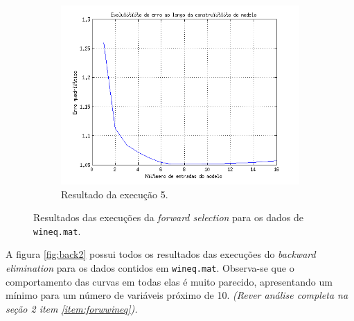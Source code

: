 \begin{figure}[H]
			\begin{subfigure}{.5\textwidth}
				  \centering
				  \includegraphics[width=1\linewidth]{image/forward5_2}
				  \caption{Resultado da execução 5.}
				  \label{forward5_2}
				\end{subfigure}	
			
			\caption{Resultados das execuções da \textit{forward selection} para os
			dados de \texttt{wineq.mat}.}
			\label{fig:forw2}
			\end{figure}
			
		\FloatBarrier

\newpage

A figura \ref{fig:back2} possui todos os resultados das
execuções do \textit{backward elimination} para os dados contidos em
\texttt{wineq.mat}. Observa-se que o comportamento das curvas em todas elas é
muito parecido, apresentando um mínimo para um número de variáveis próximo de
10. \textit{(Rever análise completa na seção 2 item \ref{item:forwwineq}).}	
		
